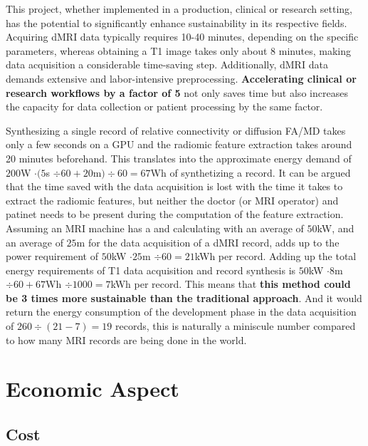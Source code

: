 This project, whether implemented in a production, clinical or research setting, has the potential to significantly enhance sustainability in its respective fields. Acquiring \ac{dMRI} data typically requires 10-40 minutes, depending on the specific parameters, whereas obtaining a T1 image takes only about 8 minutes, making data acquisition a considerable time-saving step. Additionally, \ac{dMRI} data demands extensive and labor-intensive preprocessing. \textbf{Accelerating clinical or research workflows by a factor of 5} not only saves time but also increases the capacity for data collection or patient processing by the same factor.\par
Synthesizing a single record of relative connectivity or diffusion \ac{FA}/\ac{MD} takes only a few seconds on a GPU and the radiomic feature extraction takes around 20 minutes beforehand. This translates into the approximate energy demand of $200$W $ \cdot (5$s $ \div 60 + 20$m$) \div 60 = 67$Wh of synthetizing a record. It can be argued that the time saved with the data acquisition is lost with the time it takes to extract the radiomic features, but neither the doctor (or MRI operator) and patinet needs to be present during the computation of the feature extraction. Assuming an MRI machine has a  and calculating with an average of $50$kW, and an average of $25$m for the data acquisition of a \ac{dMRI} record, adds up to the power requirement of $50$kW $ \cdot 25$m $ \div 60 = 21$kWh per record. Adding up the total energy requirements of T1 data acquisition and record synthesis is $50$kW $ \cdot 8$m $ \div 60 + 67$Wh $ \div 1000 = 7$kWh per record. This means that \textbf{this method could be 3 times more sustainable than the traditional approach}. And it would return the energy consumption of the development phase in the data acquisition of $260 \div (21 - 7) = 19$ records, this is naturally a miniscule number compared to how many MRI records are being done in the world.

\section{Economic Aspect}

\subsection{Cost}

